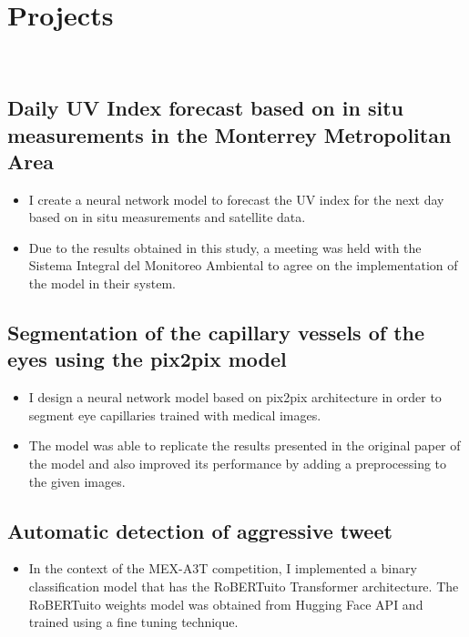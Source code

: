 \documentclass[a3paper]{adcv_color}
\begin{document}
\section{Projects}\\
\begin{addmargin}[0.5em]{0.5em}
	\subsection{Daily UV Index forecast based on in situ measurements in the Monterrey Metropolitan Area}
	\begin{itemize}
		\item I create a neural network model to forecast the UV index for the next day based on in situ measurements and satellite data.
		\item Due to the results obtained in this study, a meeting was held with the Sistema Integral del Monitoreo Ambiental to agree on the implementation of the model in their system.
	\end{itemize}
	\subsection{Segmentation of the capillary vessels of the eyes using the pix2pix model}
	\begin{itemize}
		\item I design a neural network model based on pix2pix architecture in order to segment eye capillaries trained with medical images.
		\item The model was able to replicate the results presented in the original paper of the model and also improved its performance by adding a preprocessing to the given images.
	\end{itemize}
	\subsection{Automatic detection of aggressive tweet}
	\begin{itemize}
		\item In the context of the MEX-A3T competition, I implemented a binary classification model that has the RoBERTuito Transformer architecture. The RoBERTuito weights model was obtained from Hugging Face API and trained using a fine tuning technique.
	\end{itemize}

\end{addmargin}
\end{document}
